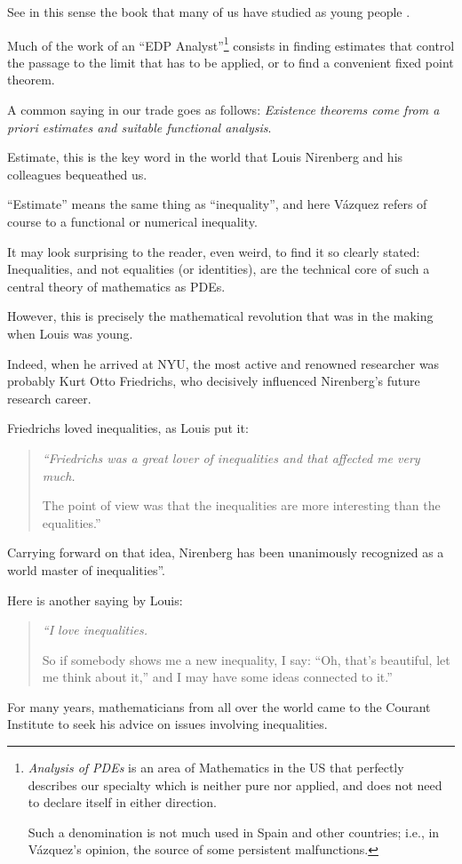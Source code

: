 \documentclass{article}
\begin{document}
See in this sense the book that many of us have studied as young people \cite{Brezis2011}.

%
Much of the work of an ``EDP Analyst''\footnote{\textit{Analysis of PDEs} is an area of Mathematics in the US that perfectly describes our specialty which is neither pure nor applied, and does not need to declare itself in either direction.
	
	Such a denomination is not much used in Spain and other countries; i.e., in V\'azquez's opinion, the source of some persistent malfunctions.} consists in finding estimates that control the passage to the limit that has to be applied, or to find a convenient fixed point theorem.

A common saying in our trade goes as follows: \textit{Existence theorems come from a priori estimates and suitable functional analysis}.

Estimate, this is the key word in the world that Louis Nirenberg and his colleagues bequeathed us.

``Estimate'' means the same thing as ``inequality'', and here V\'azquez refers of course to a functional or numerical inequality.

%
It may look surprising to the reader, even weird, to find it so clearly stated: Inequalities, and not equalities (or identities), are the technical core of such a central theory of mathematics as PDEs.

However, this is precisely the mathematical revolution that was in the making when Louis was young.

Indeed, when he arrived at NYU, the most active and renowned researcher was probably Kurt Otto Friedrichs, who decisively influenced Nirenberg's future research career.

Friedrichs loved inequalities, as Louis put it:
\begin{quotation}\it
	``Friedrichs was a great lover of inequalities and that affected me very much.
	
	The point of view was that the inequalities are more interesting than the equalities.''
\end{quotation}
Carrying forward on that idea, Nirenberg has been unanimously recognized as a world master of inequalities''.

Here is another saying by Louis:
\begin{quotation}\it
	``I love inequalities.
	
	So if somebody shows me a new inequality, I say: ``Oh, that's beautiful, let me think about it,'' and I may have some ideas connected to it.''
\end{quotation}
For many years, mathematicians from all over the world came to the Courant Institute to seek his advice on issues involving inequalities.
\end{document}

